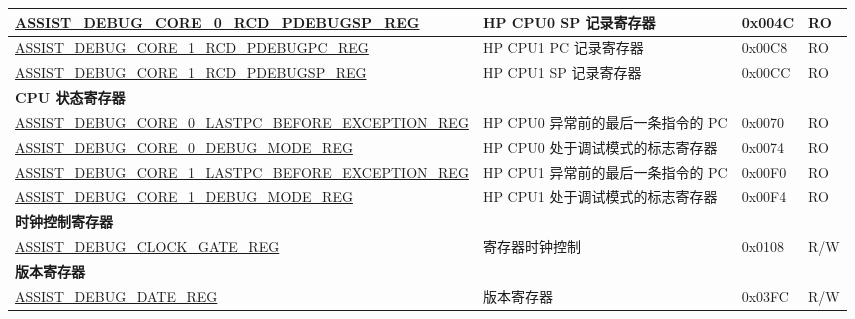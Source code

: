\begin{longtable}{ | p{8.7cm} | m{5cm} | p{1.2cm} | p{0.75cm} | }
\hyperref[regdesc:ASSISTDEBUGCORE0RCDPDEBUGSPREG]{ASSIST\_DEBUG\_CORE\_0\_RCD\_PDEBUGSP\_REG} & HP CPU0 SP 记录寄存器 & 0x004C & RO \\ \hline
\hyperref[regdesc:ASSISTDEBUGCORE1RCDPDEBUGPCREG]{ASSIST\_DEBUG\_CORE\_1\_RCD\_PDEBUGPC\_REG} & HP CPU1 PC 记录寄存器 & 0x00C8 & RO \\ \hline
\hyperref[regdesc:ASSISTDEBUGCORE1RCDPDEBUGSPREG]{ASSIST\_DEBUG\_CORE\_1\_RCD\_PDEBUGSP\_REG} & HP CPU1 SP 记录寄存器 & 0x00CC & RO \\ \hline
\multicolumn{4}{|l|}{\textbf{CPU 状态寄存器}} \\ \hline
\hyperref[regdesc:ASSISTDEBUGCORE0LASTPCBEFOREEXCEPTIONREG]{ASSIST\_DEBUG\_CORE\_0\_LASTPC\_BEFORE\_\newline EXCEPTION\_REG} & HP CPU0 异常前的最后一条指令的 PC  & 0x0070 & RO \\ \hline
\hyperref[regdesc:ASSISTDEBUGCORE0DEBUGMODEREG]{ASSIST\_DEBUG\_CORE\_0\_DEBUG\_MODE\_REG} & HP CPU0 处于调试模式的标志寄存器 & 0x0074 & RO \\ \hline
\hyperref[regdesc:ASSISTDEBUGCORE1LASTPCBEFOREEXCEPTIONREG]{ASSIST\_DEBUG\_CORE\_1\_LASTPC\_BEFORE\_\newline EXCEPTION\_REG} & HP CPU1 异常前的最后一条指令的 PC  & 0x00F0 & RO \\ \hline
\hyperref[regdesc:ASSISTDEBUGCORE1DEBUGMODEREG]{ASSIST\_DEBUG\_CORE\_1\_DEBUG\_MODE\_REG} & HP CPU1 处于调试模式的标志寄存器 & 0x00F4 & RO \\ \hline
\multicolumn{4}{|l|}{\textbf{时钟控制寄存器}} \\ \hline
\hyperref[regdesc:ASSISTDEBUGCLOCKGATEREG]{ASSIST\_DEBUG\_CLOCK\_GATE\_REG} & 寄存器时钟控制 & 0x0108 & R/W \\ \hline
\multicolumn{4}{|l|}{\textbf{版本寄存器}} \\ \hline
\hyperref[regdesc:ASSISTDEBUGDATEREG]{ASSIST\_DEBUG\_DATE\_REG} & 版本寄存器 & 0x03FC & R/W \\ \hline
\end{longtable}
